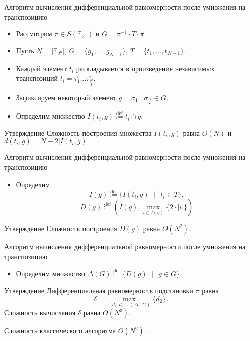 \documentclass{beamer}
\begin{document}
\begin{frame}{Алгоритм вычисления дифференциальной равномерности после умножения на транспозицию}
\begin{itemize}
    \item Рассмотрим $\pi \in S(\mathbb{F}_{2^n})$ и $G = \pi^{-1} \cdot T \cdot \pi$.
    \item Пусть $N = |\mathbb{F}_{2^{n}}|$, $G = \{g_{1}, \dots, g_{N - 1}\}$, $T = \{t_{1}, \dots, t_{N - 1}\}$.
    \item Каждый элемент $t_i$ раскладывается в произведение независимых транспозиций $t_i=\tau_1^i \dots \tau_{\frac{N}{2}}^i$.
    \item Зафиксируем некоторый элемент $g = \sigma_{1}\dots\sigma_{\frac{N}{2}} \in G$.
    \item Определим множество $I(t_{i}, g) \stackrel{\text{def}}{:=} t_{i} \cap g$.
\end{itemize}

\begin{block}{Утверждение}
 Сложность построения множества $I(t_i,g)$ равна $O(N)$ и  $d(t_{i}, g) = N - 2 |I(t_{i}, g)|$
\end{block}




\end{frame}

\begin{frame}{Алгоритм вычисления дифференциальной равномерности после умножения на транспозицию}
\begin{itemize}
    \item Определим
$$I(g) \stackrel{\text{def}}{:=} \{I(t_{i}, g) \text{ } | \text{ } t_{i} \in T \},$$
$$D(g) \stackrel{\text{def}}{:=} (I(g), \underset{i \in I(g)}{\max} {\{2 \cdot|i| \}})$$
\end{itemize}

\begin{block}{Утверждение}
 Сложность построения $D(g)$ равна $O(N^{2})$.
\end{block}
\end{frame}

\begin{frame}{Алгоритм вычисления дифференциальной равномерности после умножения на транспозицию}
\begin{itemize}
    \item Определим множество $\Delta(G) \stackrel{\text{def}}{:=} \{D(g) \text{ } | \text{ } g \in G\}$. 
\end{itemize}

\begin{block}{Утверждение}
 Дифференциальная равномерность подстановки $\pi$ равна $$\delta = \underset{(d_{1}, d_{2}) \in \Delta(G)}{\max} \{d_{2} \}.$$ Сложность вычисления $\delta$ равна $O(N^{3})$.
\end{block}


Сложность классического алгоритма $O(N^2)$...
\end{frame}
\end{document}
